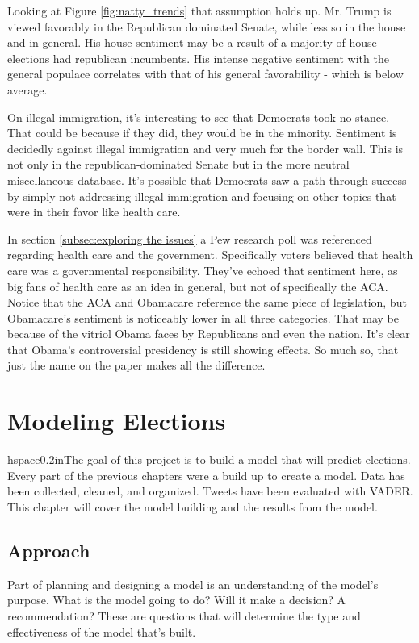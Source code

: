 \documentclass[11pt, twoside, reqno]{book}
\begin{document}
Looking at Figure \ref{fig:natty_trends} that assumption holds up. Mr. Trump is viewed favorably in the Republican dominated Senate, while less so in the house and in general. His house sentiment may be a result of a majority of house elections had republican incumbents. His intense negative sentiment with the general populace correlates with that of his general favorability - which is below average. 

On illegal immigration, it's interesting to see that Democrats took no stance. That could be because if they did, they would be in the minority. Sentiment is decidedly against illegal immigration and very much for the border wall. This is not only in the republican-dominated Senate but in the more neutral miscellaneous database. It's possible that Democrats saw a path through success by simply not addressing illegal immigration and focusing on other topics that were in their favor like health care. 

In section \ref{subsec:exploring the issues} a Pew research poll was referenced regarding health care and the government. Specifically voters believed that health care was a governmental responsibility. They've echoed that sentiment here, as big fans of health care as an idea in general, but not of specifically the ACA. Notice that the ACA and Obamacare reference the same piece of legislation, but Obamacare's sentiment is noticeably lower in all three categories. That may be because of the vitriol Obama faces by Republicans and even the nation. It's clear that Obama's controversial presidency is still showing effects. So much so, that just the name on the paper makes all the difference.  

\chapter{Modeling Elections}
\label{ch:modeling}
hspace{0.2in}The goal of this project is to build a model that will predict elections. Every part of the previous chapters were a build up to create a model. Data has been collected, cleaned, and organized. Tweets have been evaluated with VADER. This chapter will cover the model building and the results from the model. 

\section{Approach}
\hspace{0.2in}Part of planning and designing a model is an understanding of the model's purpose. What is the model going to do? Will it make a decision? A recommendation? These are questions that will determine the type and effectiveness of the model that's built. 
\end{document}
